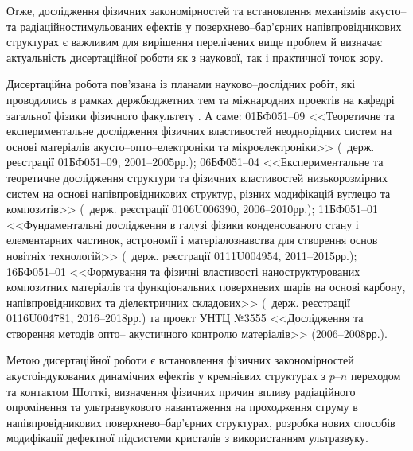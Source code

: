 Отже,  дослідження фізичних  закономірностей  та встановлення механізмів акусто-- та радіаційностимульованих
ефектів у поверхнево--бар'єрних напівпровідникових структурах  є  важливим  для  вирішення  перелічених  вище  проблем  й визначає актуальність дисертаційної роботи як з наукової, так і практичної точок зору.


{\InterconnectionTXT}
Дисертаційна робота  пов’язана із планами науково--дослідних робіт, які проводились в рамках
держбюджетних тем та міжнародних проектів на кафедрі загальної фізики фізичного факультету \thesisOfOrganization.
А саме:
\textnumero01БФ051--09 <<Теоретичне та експериментальне дослідження фізичних властивостей неоднорідних систем на основі матеріалів акусто--опто--електроніки та мікроелектроніки>>
(\textnumero~держ. реєстрації 01БФ051--09, 2001--2005рр.);
\textnumero06БФ051--04 <<Експериментальне та теоретичне дослідження структури та фізичних властивостей низькорозмірних систем на основі напівпровідникових структур, різних модифікацій вуглецю та композитів>>
(\textnumero~держ. реєстрації 0106U006390, 2006--2010рр.);
\textnumero11БФ051--01 <<Фундаментальні дослідження в галузі фізики конденсованого стану і елементарних частинок, астрономії і матеріалознавства для створення основ новітніх технологій>>
(\textnumero~держ. реєстрації 0111U004954, 2011--2015рр.);
\textnumero16БФ051--01 <<Формування та фізичні властивості наноструктурованих композитних матеріалів та функціональних поверхневих шарів на основі карбону, напівпровідникових та діелектричних складових>>
(\textnumero~держ. реєстрації  0116U004781, 2016--2018рр.) та
проект УНТЦ №3555 <<Дослідження та створення методів опто-- акустичного контролю матеріалів>> (2006--2008рр.).

{\AimAndTasksTXT}
Метою дисертаційної роботи є
встановлення фізичних закономірностей акустоіндукованих динамічних ефектів у кремнієвих структурах з $p$--$n$ переходом та контактом Шотткі,
визначення фізичних причин впливу радіаційного опромінення та ультразвукового навантаження на проходження струму в напівпровідникових поверхнево--бар'єрних структурах,
 розробка нових способів модифікації дефектної підсистеми кристалів з використанням ультразвуку.


